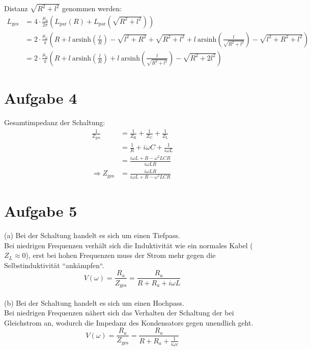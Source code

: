 \documentclass[11pt a4paper]{article}
\newcommand{\arsinh}{\text{arsinh}}
\begin{document}
Distanz $\sqrt{R^2 + l^2}$ genommen werden:
\begin{align*}
	L_\text{ges} 
	&= 4 \cdot \frac{\mu_0}{2\pi}
		\left( L_\text{par} (R) + L_\text{par} \left( \sqrt{R^2 + l^2} \right) \right) \\
	&= 2 \cdot \frac{\mu_0}{\pi} \left( 
			R + l \ \arsinh \left(\frac{l}{R} \right) - \sqrt{l^2 + R^2} + 
			\sqrt{R^2 + l^2} + l \ \arsinh \left(\frac{l}{\sqrt{R^2 + l^2}} \right) 
			- \sqrt{l^2 + R^2 + l^2}
		\right) \\
	&= 2 \cdot \frac{\mu_0}{\pi} \left( 
			R + l \ \arsinh \left(\frac{l}{R} \right)
			  + l \ \arsinh \left(\frac{l}{\sqrt{R^2 + l^2}} \right) 
			- \sqrt{R^2 + 2l^2}
		\right)
\end{align*}



\newpage

\section*{Aufgabe 4}

Gesamtimpedanz der Schaltung:
\begin{align*}
	\frac1{Z_\text{ges}}
	&= \frac1{Z_\text{R}} + \frac1{Z_\text{C}} + \frac1{Z_\text{L}} \\
	&= \frac1R + i\omega C + \frac1{i\omega L} \\
	&= \frac{i\omega L + R - \omega^2 LCR}{i\omega LR} \\
	\Rightarrow
	Z_\text{ges} &= \frac{i\omega LR}{i\omega L + R - \omega^2 LCR}
\end{align*}

\newpage

\section*{Aufgabe 5}

\quad (a) Bei der Schaltung handelt es sich um einen Tiefpass. \\
Bei niedrigen Frequenzen verhält sich die Induktivität 
wie ein normales Kabel ($Z_L \approx 0$), erst bei hohen Frequenzen muss der Strom mehr gegen die 
Selbstinduktivität ``ankämpfen``.
\[ V(\omega) = \frac{R_a}{Z_\text{ges}} = \frac{R_a}{R + R_a + i\omega L} \]
\\

(b) Bei der Schaltung handelt es sich um einen Hochpass. \\
Bei niedrigen Frequenzen nähert sich das Verhalten der
Schaltung der bei Gleichstrom an, wodurch die Impedanz des Kondensators gegen unendlich geht.
\[ V(\omega) = \frac{R_a}{Z_\text{ges}} = \frac{R_a}{R + R_a + \frac{1}{i\omega c}} \]
\\
\end{document}
